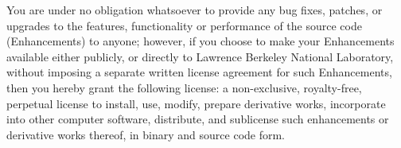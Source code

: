 \documentclass[letterpaper,10pt,english]{sphinxmanual}
\begin{document}
You are under no obligation whatsoever to provide any bug fixes, patches,
or upgrades to the features, functionality or performance of the source code
(\sphinxquotedblleft{}Enhancements\sphinxquotedblright{}) to anyone; however, if you choose to make your Enhancements
available either publicly, or directly to Lawrence Berkeley National Laboratory,
without imposing a separate written license agreement for such Enhancements,
then you hereby grant the following license: a non-exclusive, royalty-free,
perpetual license to install, use, modify, prepare derivative works, incorporate
into other computer software, distribute, and sublicense such enhancements or
derivative works thereof, in binary and source code form.



\renewcommand{\indexname}{Index}
\printindex
\end{document}
